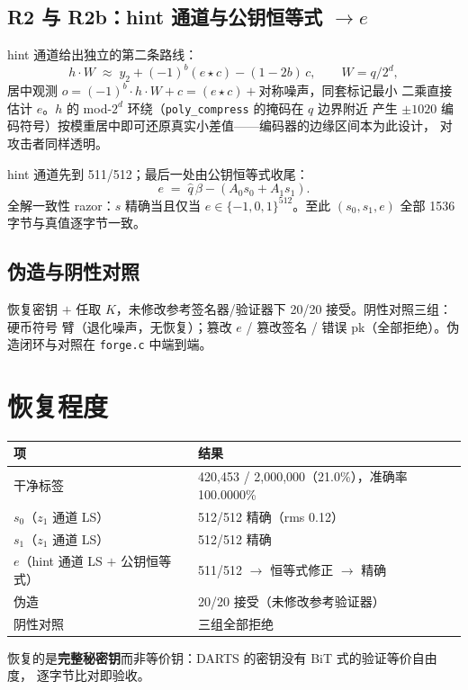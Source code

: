 \documentclass[UTF8,11pt,a4paper]{ctexart}
\newcommand{\code}[1]{\texttt{\small #1}}
\begin{document}
\subsection{R2 与 R2b：hint 通道与公钥恒等式 $\to e$}

hint 通道给出独立的第二条路线：
\[
h\cdot W \;\approx\; y_2 + (-1)^b (e \star c) - (1-2b)\,c,\qquad W = q/2^d,
\]
居中观测 $o = (-1)^b\cdot h\cdot W + c = (e \star c) + \text{对称噪声}$，同套标记最小
二乘直接估计 $e$。$h$ 的 mod-$2^d$ 环绕（\code{poly\_compress} 的掩码在 $q$ 边界附近
产生 $\pm 1020$ 编码符号）按模重居中即可还原真实小差值——编码器的边缘区间本为此设计，
对攻击者同样透明。

hint 通道先到 511/512；最后一处由公钥恒等式收尾：
\[
e \;=\; \hat q\,\beta - (A_0 s_0 + A_1 s_1).
\]
全解一致性 razor：$s$ 精确当且仅当 $e \in \{-1,0,1\}^{512}$。至此 $(s_0, s_1, e)$
全部 1536 字节与真值逐字节一致。

\subsection{伪造与阴性对照}

恢复密钥 $+$ 任取 $K$，未修改参考签名器/验证器下 20/20 接受。阴性对照三组：硬币符号
臂（退化噪声，无恢复）；篡改 $e$ / 篡改签名 / 错误 pk（全部拒绝）。伪造闭环与对照在
\code{forge.c} 中端到端。

\section{恢复程度}

\begin{table}[htbp]\centering\small
\begin{tabular}{@{}ll@{}}
\toprule
项 & 结果 \\
\midrule
干净标签 & 420{,}453 / 2{,}000{,}000（21.0\%），准确率 100.0000\% \\
$s_0$（$z_1$ 通道 LS） & 512/512 精确（rms 0.12） \\
$s_1$（$z_1$ 通道 LS） & 512/512 精确 \\
$e$（hint 通道 LS $+$ 公钥恒等式） & 511/512 $\to$ 恒等式修正 $\to$ 精确 \\
伪造 & 20/20 接受（未修改参考验证器） \\
阴性对照 & 三组全部拒绝 \\
\bottomrule
\end{tabular}
\end{table}

恢复的是\textbf{完整秘密钥}而非等价钥：DARTS 的密钥没有 BiT 式的验证等价自由度，
逐字节比对即验收。
\end{document}
